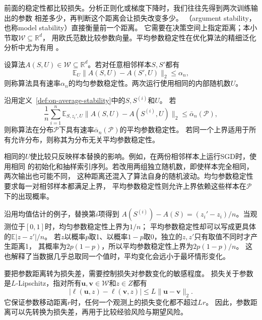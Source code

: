 前面的稳定性都比较损失。分析正则化或梯度下降时，我们往往先得到两次训练输出的参数
相差多少，再判断这个距离会让损失改变多少。
（argument stability，也称model stability）直接衡量前一个距离。
它需要在决策空间上指定距离；本小节取$\mathcal W\subseteq\mathbb R^d$，
用欧氏范数比较参数向量。平均参数稳定性在优化算法的精细泛化分析中尤为有用
。

\begin{definition}[均匀参数稳定性]
\label{def:uniform-parameter-stability}
设算法$A(S,U)\in\mathcal W\subseteq\mathbb R^d$。若对任意相邻样本$S,S'$都有
\[
 \mathbb E_U\|A(S,U)-A(S',U)\|_2\leq\alpha_n,
\]
则称算法具有速率$\alpha_n$的均匀参数稳定性。两次运行使用相同的内部随机数$U$。
\end{definition}

\begin{definition}[平均参数稳定性]
\label{def:average-parameter-stability}
沿用定义~\ref{def:on-average-stability}中的$S,S^{(i)}$和$U$。
若
\begin{equation}
 \frac1n\sum_{i=1}^n\mathbb E_{S,z_i',U}
 \|A(S,U)-A(S^{(i)},U)\|_2\leq\bar\alpha_n(\mathcal P),
 \label{eq:average-parameter-stability}
\end{equation}
则称算法在分布$\mathcal P$下具有速率$\bar\alpha_n(\mathcal P)$的平均参数稳定性。
若同一个上界适用于所有允许分布，则称其为分布无关平均参数稳定性。
\end{definition}

相同的$U$使比较只反映样本替换的影响。例如，在两份相邻样本上运行SGD时，使用相同
的初始化和抽样索引序列。若改用两组独立随机数，即使样本完全相同，两次输出也可能不同，
这种距离还混入了算法自身的随机波动。均匀参数稳定性要求每一对相邻样本都满足上界，
平均参数稳定性则允许上界依赖这些样本在$\mathcal P$下的出现概率。

沿用均值估计的例子，替换第$i$项得到
$A(S^{(i)})-A(S)=(z_i'-z_i)/n$。当观测位于$[0,1]$时，均匀参数稳定性上界为$1/n$；
平均参数稳定性却可以写成更具体的$\mathbb E|z-z'|/n$。
若$z$以概率$p$取1、以概率$1-p$取0，独立的$z,z'$只有取值不同时才产生距离1，
其概率为$2p(1-p)$，所以平均参数稳定性上界为$2p(1-p)/n$。
这也解释了当数据几乎总取同一个值时，平均变化会远小于最坏情形变化。

要把参数距离转为损失差，需要控制损失对参数变化的敏感程度。
损失关于参数是$L$-Lipschitz，指对所有$\bm u,\bm v\in\mathcal W$和$z\in Z$都有
\begin{equation}
 |\ell(\bm u,z)-\ell(\bm v,z)|\leq L\|\bm u-\bm v\|_2.
 \label{eq:parameter-loss-lipschitz}
\end{equation}
它保证参数移动距离$r$时，任何一个观测上的损失变化都不超过$Lr$。
因此，参数距离可以先转换为损失差，再用于比较经验风险与期望风险。

